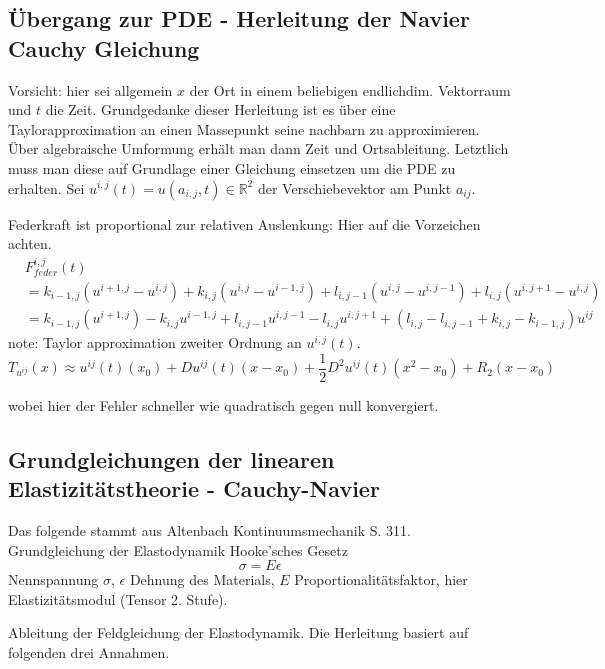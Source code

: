 \subsection*{Übergang zur PDE - Herleitung der Navier Cauchy Gleichung}
Vorsicht: hier sei allgemein $x$ der Ort in einem beliebigen endlichdim. Vektorraum und $t$ die Zeit.
Grundgedanke dieser Herleitung ist es über eine Taylorapproximation an einen Massepunkt seine nachbarn zu approximieren. Über algebraische Umformung erhält man dann Zeit und Ortsableitung. Letztlich muss man diese auf Grundlage einer Gleichung einsetzen um die PDE zu erhalten. Sei $u^{i,j}(t) = u(a_{i,j}, t) \in \mathbb{R}^2$ der Verschiebevektor am Punkt $a_{ij}$.

Federkraft ist proportional zur relativen Auslenkung: Hier auf die Vorzeichen achten.
\begin{align*}
	&F^{i,j}_{feder} (t) \\
	&= k_{i-1,j} (u^{i+1,j} - u^{i,j}) + k_{i,j} (u^{i,j} - u^{i-1,j}) + l_{i,j-1} (u^{i,j} - u^{i,j-1}) + l_{i,j} (u^{i,j+1} - u^{i,j}) \\
	&= k_{i-1,j} (u^{i+1,j}) - k_{i,j}  u^{i-1,j} + l_{i,j-1}  u^{i,j-1} - l_{i,j} u^{i,j+1} + (l_{i,j}- l_{i,j-1}+ k_{i,j}-k_{i-1,j}) u^{ij}
\end{align*}
note: 
Taylor approximation zweiter Ordnung an $u^{i,j}(t)$.
\begin{equation*}
	T_{u^{ij}}(x) \approx u^{ij}(t)(x_0) + D u^{ij}(t)(x-x_0) + \frac{1}{2} D^2 u^{ij}(t)(x^2-x_0) + R_2(x-x_0)
\end{equation*}

wobei hier der Fehler schneller wie quadratisch gegen null konvergiert.

\subsection{Grundgleichungen der linearen Elastizitätstheorie - Cauchy-Navier}
Das folgende stammt aus Altenbach Kontinuumsmechanik S. 311. Grundgleichung der Elastodynamik
Hooke'sches Gesetz
\begin{equation*}
	\sigma = E \epsilon
\end{equation*}
Nennspannung $\sigma$, $\epsilon$ Dehnung des Materials, $E$ Proportionalitätsfaktor, hier Elastizitätsmodul (Tensor 2. Stufe).


Ableitung der Feldgleichung der Elastodynamik. Die Herleitung basiert auf folgenden drei Annahmen.

